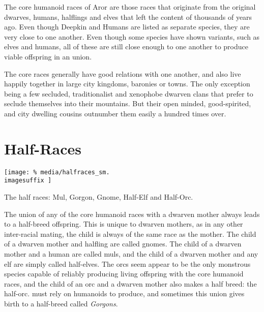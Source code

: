 The core humanoid races of Aror are those races that originate from the
original dwarves, humans, halflings and elves that left the content of
 thousands of years ago. Even though Deepkin and Humans
are listed as separate species, they are very close to one another. Even though
some species have shown variants, such as elves and humans, all of these are
still close enough to one another to produce viable offspring in an union.

The core races generally have good relations with one another, and also live
happily together in large city kingdoms, baronies or towns. The only exception
being a few secluded, traditionalist and xenophobe dwarven clans that prefer
to seclude themselves into their mountains. But their open minded,
good-spirited, and city dwelling cousins outnumber them easily a hundred times
over.







\section{Half-Races}
\label{sec:Half-Races}

\ifimages
\begin{figure*}[ht!]
  \centering
  \vspace{-2.6cm}
  \centerline{
    \texttt{[image: \%
      media/halfraces\_sm.\\imagesuffix
    ]}
  }
  \par
  The half races: Mul, Gorgon, Gnome, Half-Elf and Half-Orc.
\end{figure*}
\fi

The union of any of the core humanoid races with a dwarven mother always leads
to a half-breed offspring. This is unique to dwarven mothers, as in any other
inter-racial mating, the child is always of the same race as the mother. The
child of a dwarven mother and halfling are called gnomes. The child of a
dwarven mother and a human are called muls, and the child of a dwarven mother
and any elf are simply called half-elves. The orcs seem appear to be the only
monstrous species capable of reliably producing living offspring with the
core humanoid races, and the child of an orc and a dwarven mother also makes
a half breed: the half-orc.  must rely on humanoids to
produce, and sometimes this union gives birth to a half-breed called
\emph{Gorgons}.


